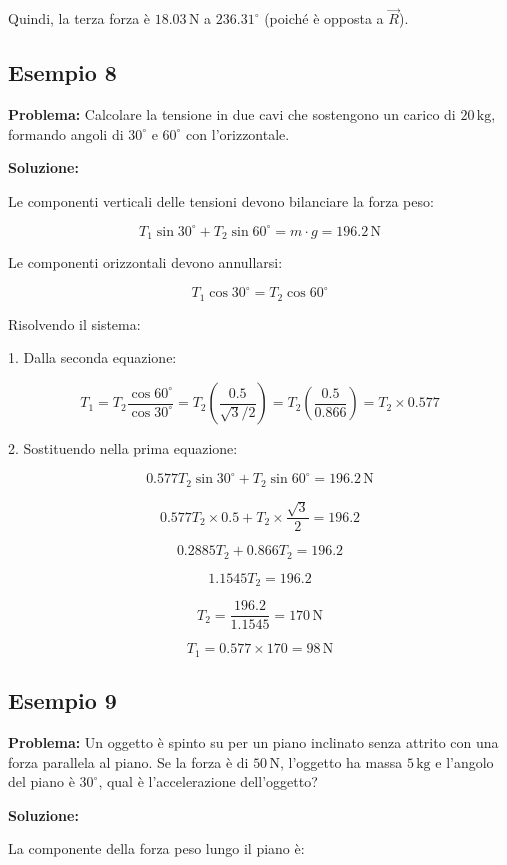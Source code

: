 \documentclass[a4paper,12pt]{article}
\begin{document}
Quindi, la terza forza è $18.03\,\text{N}$ a $236.31^\circ$ (poiché è opposta a $\vec{R}$).

\subsection*{Esempio 8}

\textbf{Problema:} Calcolare la tensione in due cavi che sostengono un carico di $20\,\text{kg}$, formando angoli di $30^\circ$ e $60^\circ$ con l'orizzontale.

\textbf{Soluzione:}

Le componenti verticali delle tensioni devono bilanciare la forza peso:

\[
T_1 \sin{30^\circ} + T_2 \sin{60^\circ} = m \cdot g = 196.2\,\text{N}
\]

Le componenti orizzontali devono annullarsi:

\[
T_1 \cos{30^\circ} = T_2 \cos{60^\circ}
\]

Risolvendo il sistema:

1. Dalla seconda equazione:

\[
T_1 = T_2 \frac{\cos{60^\circ}}{\cos{30^\circ}} = T_2 \left(\frac{0.5}{\sqrt{3}/2}\right) = T_2 \left(\frac{0.5}{0.866}\right) = T_2 \times 0.577
\]

2. Sostituendo nella prima equazione:

\[
0.577 T_2 \sin{30^\circ} + T_2 \sin{60^\circ} = 196.2\,\text{N}
\]

\[
0.577 T_2 \times 0.5 + T_2 \times \frac{\sqrt{3}}{2} = 196.2
\]

\[
0.2885 T_2 + 0.866 T_2 = 196.2
\]

\[
1.1545 T_2 = 196.2
\]

\[
T_2 = \frac{196.2}{1.1545} = 170\,\text{N}
\]

\[
T_1 = 0.577 \times 170 = 98\,\text{N}
\]

\subsection*{Esempio 9}

\textbf{Problema:} Un oggetto è spinto su per un piano inclinato senza attrito con una forza parallela al piano. Se la forza è di $50\,\text{N}$, l'oggetto ha massa $5\,\text{kg}$ e l'angolo del piano è $30^\circ$, qual è l'accelerazione dell'oggetto?

\textbf{Soluzione:}

La componente della forza peso lungo il piano è:
\end{document}
